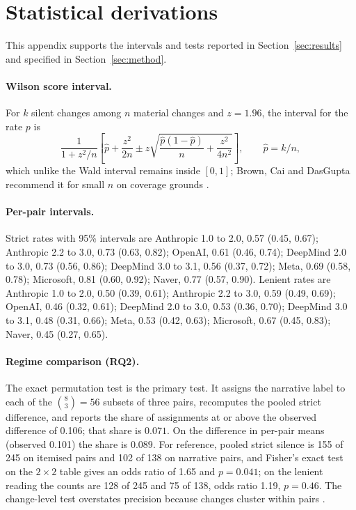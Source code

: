 \documentclass{article}
\begin{document}
\section{Statistical derivations}
\label{apx:stats}
This appendix supports the intervals and tests reported in Section~\ref{sec:results} and specified in Section~\ref{sec:method}.
\paragraph{Wilson score interval.} For $k$ silent changes among $n$ material changes and $z = 1.96$, the interval for the rate $p$ is
\begin{equation}
\frac{1}{1+z^2/n}\left[\hat p + \frac{z^2}{2n} \pm z\sqrt{\frac{\hat p(1-\hat p)}{n} + \frac{z^2}{4n^2}}\right], \qquad \hat p = k/n,
\end{equation}
which unlike the Wald interval remains inside $[0,1]$; Brown, Cai and DasGupta \citep{brown2001interval} recommend it for small $n$ on coverage grounds \citep{wilson1927probable}.
\paragraph{Per-pair intervals.} Strict rates with 95\% intervals are Anthropic 1.0 to 2.0, 0.57 (0.45, 0.67); Anthropic 2.2 to 3.0, 0.73 (0.63, 0.82); OpenAI, 0.61 (0.46, 0.74); DeepMind 2.0 to 3.0, 0.73 (0.56, 0.86); DeepMind 3.0 to 3.1, 0.56 (0.37, 0.72); Meta, 0.69 (0.58, 0.78); Microsoft, 0.81 (0.60, 0.92); Naver, 0.77 (0.57, 0.90). Lenient rates are Anthropic 1.0 to 2.0, 0.50 (0.39, 0.61); Anthropic 2.2 to 3.0, 0.59 (0.49, 0.69); OpenAI, 0.46 (0.32, 0.61); DeepMind 2.0 to 3.0, 0.53 (0.36, 0.70); DeepMind 3.0 to 3.1, 0.48 (0.31, 0.66); Meta, 0.53 (0.42, 0.63); Microsoft, 0.67 (0.45, 0.83); Naver, 0.45 (0.27, 0.65).
\paragraph{Regime comparison (RQ2).} The exact permutation test is the primary test. It assigns the narrative label to each of the $\binom{8}{3} = 56$ subsets of three pairs, recomputes the pooled strict difference, and reports the share of assignments at or above the observed difference of 0.106; that share is $0.071$. On the difference in per-pair means (observed 0.101) the share is $0.089$. For reference, pooled strict silence is 155 of 245 on itemised pairs and 102 of 138 on narrative pairs, and Fisher's exact test on the $2 \times 2$ table gives an odds ratio of 1.65 and $p = 0.041$; on the lenient reading the counts are 128 of 245 and 75 of 138, odds ratio 1.19, $p = 0.46$. The change-level test overstates precision because changes cluster within pairs \citep{cameron2015practitioner}.
\end{document}
